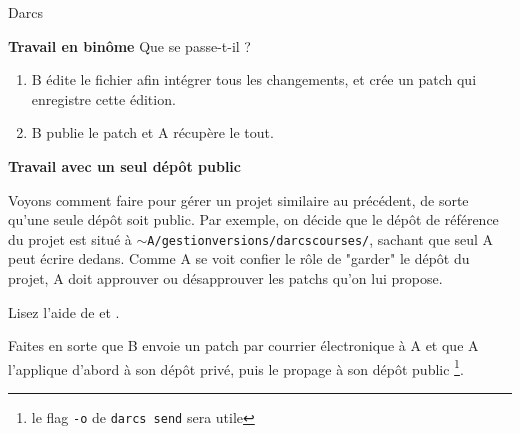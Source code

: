 \documentclass[10pt]{article}\usepackage[nu]{esial}
\begin{document}
\begin{part}{Darcs}
\begin{Exercice} {\bf Travail en binôme}
Que se passe-t-il ?

\begin{enumerate}
\item B édite le fichier afin intégrer tous les changements, et crée
      un patch qui enregistre cette édition.
\item B publie le patch et A récupère le tout.
\end{enumerate}
\end{Exercice}

\begin{Exercice} {\bf Travail avec un seul dépôt public}

Voyons comment faire pour gérer un projet similaire au précédent, de sorte
qu'une seule dépôt soit public.
Par exemple, on décide que le dépôt de référence du projet est situé à
{\tt $\sim$A/gestionversions/darcscourses/}, sachant que seul A peut écrire dedans.
Comme A se voit confier le rôle de "garder" le dépôt du projet,
A doit approuver ou désapprouver les patchs qu'on lui propose.

Lisez l'aide de  et .

Faites en sorte que B envoie un patch par courrier électronique à A et que A
l'applique d'abord à son dépôt privé, puis le propage à son dépôt public
\footnote{le flag {\tt -o} de {\tt darcs send} sera utile}.
\end{Exercice}


\end{part}
\end{document}
